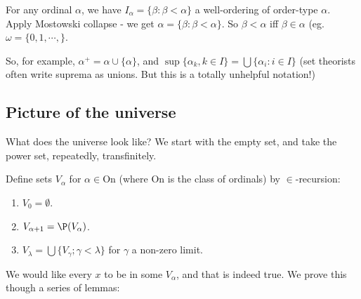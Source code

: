 \documentclass[a4paper]{article}
\begin{document}
\note For any ordinal $\alpha$, we have $I_\alpha = \{\beta: \beta < \alpha \}$ a well-ordering of order-type $\alpha$. Apply Mostowski collapse - we get $\alpha = \{\beta: \beta < \alpha\}$. So $\beta < \alpha$ iff $\beta \in \alpha$ (eg. $\omega = \{0, 1, \cdots, \}$.

So, for example, $\alpha^+ = \alpha \cup \{\alpha\}$, and $\sup \{\alpha_k, k\in I\} = \bigcup\{\alpha_i: i\in I\}$ (set theorists often write suprema as unions. But this is a totally unhelpful notation!)

\subsection{Picture of the universe}
What does the universe look like? We start with the empty set, and take the power set, repeatedly, transfinitely.

\begin{defi}
  Define sets $V_\alpha$ for $\alpha \in \mathrm{On}$ (where $\mathrm{On}$ is the class of ordinals) by $\in$-recursion:
  \begin{enumerate}
    \item $V_0 = \emptyset$.
    \item $V_{\alpha + 1} = \P(V_\alpha)$.
    \item $V_\lambda = \bigcup\{V_\gamma; \gamma < \lambda\}$ for $\gamma$ a non-zero limit.
  \end{enumerate}
\end{defi}
\begin{center}
\end{center}
We would like every $x$ to be in some $V_\alpha$, and that is indeed true. We prove this though a series of lemmas:
\end{document}
